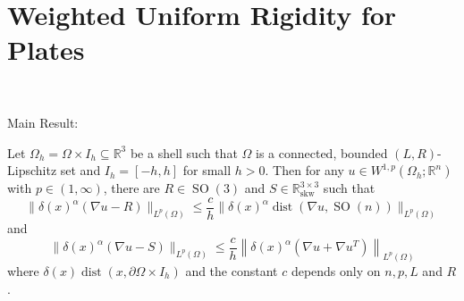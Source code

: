 \section{Weighted Uniform Rigidity for Plates}\

Main Result:
\begin{theorem} Let $\Omega_h=\Omega\times I_h \subseteq \mathbb{R}^3$ be a shell such that $\Omega$ is  a connected, bounded $(L, R)$-Lipschitz set and $I_h=[-h,h]$ for small $h>0$. Then for any $u \in W^{1, p}\left(\Omega_h ; \mathbb{R}^n\right)$ with $p \in(1, \infty)$, there are $R \in \operatorname{SO}(3)$ and $S \in \mathbb{R}_{\mathrm{skw}}^{3 \times 3}$ such that
$$
\|\delta(x)^\alpha(\nabla u-R)\|_{L^p(\Omega)} \leq \frac{c}{h}\|\delta(x)^\alpha\operatorname{dist}(\nabla u, \operatorname{SO}(n))\|_{L^p(\Omega)}
$$
and
$$
\|\delta(x)^\alpha(\nabla u-S)\|_{L^p(\Omega)} \leq  \frac{c}{h}\left\|\delta(x)^\alpha(\nabla u+\nabla u^T)\right\|_{L^p(\Omega)}
$$
where $\delta(x)\operatorname{dist}(x,\partial \Omega\times I_h)$ and the constant $c$ depends only on $n, p, L$ and $R$.
\end{theorem}

